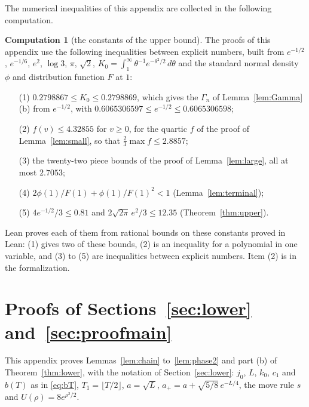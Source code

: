 \documentclass[12pt]{amsart}
\theoremstyle{definition}
\newtheorem{computation}[theorem]{Computation}
\numberwithin{equation}{section}
\newcommand{\leanmap}[1]{\ignorespaces}
\newcommand{\mapnote}[1]{\ignorespaces}
\begin{document}
The numerical inequalities of this appendix are collected in the following computation.

\begin{computation}[the constants of the upper bound]\label{comp:upper}
\leanmap{RegretKappa.UpperSharp.quartic_le, RegretKappa.UpperSharp.exp_neg_half_bounds,
  RegretKappa.UpperSharp.K0_ge, RegretKappa.UpperSharp.K0_le, RegretKappa.UpperSharp.piece_1,
  RegretKappa.UpperSharp.mills_num, RegretKappa.UpperSharp.const_c_le}
\mapnote{one theorem for each piece, \lname{RegretKappa.UpperSharp.piece_1} to \lname{RegretKappa.UpperSharp.piece_22}; the rational bounds of the constants are in the module Consts}
The proofs of this appendix use the following inequalities between explicit numbers, built from $e^{-1/2}$, $e^{-1/6}$, $e^2$, $\log3$, $\pi$, $\sqrt2$, $K_0=\int_1^\infty\theta^{-1}e^{-\theta^2/2}\,d\theta$ and the standard normal density $\phi$ and distribution function $F$ at $1$:
\begin{enumerate}
\item[(1)] $0.2798867\le K_0\le0.2798869$, which gives the $\Gamma_n$ of Lemma~\ref{lem:Gamma}(b) from $e^{-1/2}$, with $0.6065306597\le e^{-1/2}\le0.6065306598$;
\item[(2)] $f(v)\le4.32855$ for $v\ge0$, for the quartic $f$ of the proof of Lemma~\ref{lem:small}, so that $\frac23\max f\le2.8857$;
\item[(3)] the twenty-two piece bounds of the proof of Lemma~\ref{lem:large}, all at most $2.7053$;
\item[(4)] $2\phi(1)/F(1)+\phi(1)/F(1)^2<1$ (Lemma~\ref{lem:terminal});
\item[(5)] $4e^{-1/2}/3\le0.81$ and $2\sqrt{2\pi}\,e^2/3\le12.35$ (Theorem~\ref{thm:upper}).
\end{enumerate}
Lean proves each of them from rational bounds on these constants proved in Lean: (1) gives two of these bounds, (2) is an inequality for a polynomial in one variable, and (3) to (5) are inequalities between explicit numbers. Item (2) is  in the formalization.
\end{computation}

\section{Proofs of Sections~\ref{sec:lower} and~\ref{sec:proofmain}}\label{app:lower}

This appendix proves Lemmas~\ref{lem:chain} to~\ref{lem:phase2} and part (b) of Theorem~\ref{thm:lower}, with the notation of Section~\ref{sec:lower}: $j_0$, $L$, $k_0$, $c_1$ and $b(T)$ as in \eqref{eq:bT}, $T_1=\lfloor T/2\rfloor$, $a=\sqrt L$, $a_+=a+\sqrt{5/8}\,e^{-L/4}$, the move rule $s$ and $U(\rho)=8e^{\rho^2/2}$.
\end{document}
